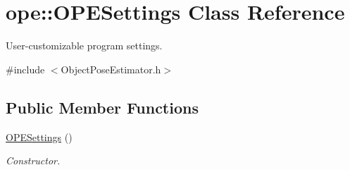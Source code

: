 \hypertarget{classope_1_1_o_p_e_settings}{\section{ope\-:\-:O\-P\-E\-Settings Class Reference}
\label{classope_1_1_o_p_e_settings}
}


User-\/customizable program settings.  




{\ttfamily \#include $<$Object\-Pose\-Estimator.\-h$>$}

\subsection*{Public Member Functions}
\begin{DoxyCompactItemize}
\item 
\hyperlink{classope_1_1_o_p_e_settings_a9d1ff2572762b29cacb7496b7dcbd1c0}{O\-P\-E\-Settings} ()
\begin{DoxyCompactList}\small\item\em Constructor. \end{DoxyCompactList}\end{DoxyCompactItemize}
